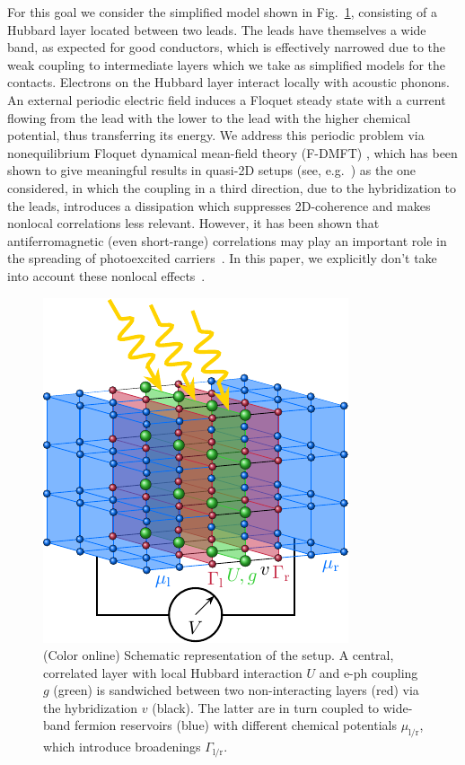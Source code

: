 \documentclass[aps,prb,groupedaddress,showpacs,twocolumn,superscriptaddress,10pt]{revtex4-2}
\newcommand{\resub}[1]{{\color{hblue} #1}}
\begin{document}
For this goal we consider the simplified model shown in Fig.~\ref{fig:setup}, consisting of a Hubbard layer located between two leads. The leads have themselves a wide band, as expected for good conductors, which is effectively narrowed due to the weak coupling to intermediate layers which we take as simplified models for the contacts. Electrons on the Hubbard layer interact locally with acoustic phonons. An external periodic electric field induces a Floquet steady state with a current flowing from the lead with the lower to the lead with the higher chemical potential, thus transferring its energy. We address this periodic problem via nonequilibrium Floquet dynamical mean-field theory (F-DMFT)\resub{, which has been shown to give meaningful results in quasi-2D setups (see, e.g.~\cite{so.do.18}) as the one considered, in which the coupling in a third direction, due to the hybridization to the leads, introduces a dissipation which suppresses 2D-coherence and makes nonlocal correlations less relevant. However, it has been shown that antiferromagnetic (even short-range) correlations may play an important role in the spreading of photoexcited carriers~\cite{ec.we.14}. In this paper, we explicitly don't take into account these nonlocal effects~\cite{ro.ha.18}.}             
        
\begin{figure}[b] 
\includegraphics[width=0.75\linewidth]{Fig1.pdf}
\caption{(Color online) Schematic representation of the setup. A central, correlated layer with local Hubbard interaction $U$ and e-ph coupling $g$ (green) is sandwiched between two non-interacting layers (red) via the hybridization $v$ (black). The latter are in turn coupled to wide-band fermion reservoirs (blue) with different chemical potentials $\mu_{\text{l}/\text{r}}$, which introduce broadenings $\Gamma_{\text{l}/\text{r}}$.}
\label{fig:setup}
\end{figure}      
    
\end{document}
